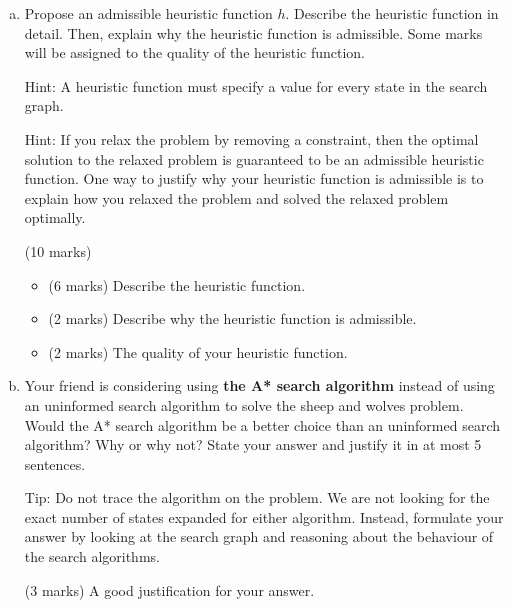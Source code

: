 \documentclass[12pt]{article}
\begin{document}
\begin{enumerate}[(a)]
State the algorithm of your choice and justify your answer in at most 5 sentences.
\begin{markscheme}

(3 marks) Provide a good reason for choosing a particular uninformed algorithm.
\end{markscheme}


\item
\label{mc_part_heuristic}

Propose an admissible heuristic function $h$. Describe the heuristic function in detail. Then, explain why the heuristic function is admissible. Some marks will be assigned to the quality of the heuristic function.

Hint: A heuristic function must specify a value for every state in the search graph.

Hint: If you relax the problem by removing a constraint, then the optimal solution to the relaxed problem is guaranteed to be an admissible heuristic function. One way to justify why your heuristic function is admissible is to explain how you relaxed the problem and solved the relaxed problem optimally. 

\begin{markscheme}
(10 marks)
\begin{itemize}
  \item (6 marks) Describe the heuristic function.
  \item (2 marks) Describe why the heuristic function is admissible.
  \item (2 marks) The quality of your heuristic function.
\end{itemize}

\end{markscheme}


\item
Your friend is considering using {\bf the A* search algorithm} instead of using an uninformed search algorithm to solve the sheep and wolves problem. Would the A* search algorithm be a better choice than an uninformed search algorithm? Why or why not? State your answer and justify it in at most 5 sentences.

Tip: Do not trace the algorithm on the problem. We are not looking for the exact number of states expanded for either algorithm. Instead, formulate your answer by looking at the search graph and reasoning about the behaviour of the search algorithms.

\begin{markscheme}
(3 marks) A good justification for your answer.
\end{markscheme}


\end{enumerate}
\end{document}
